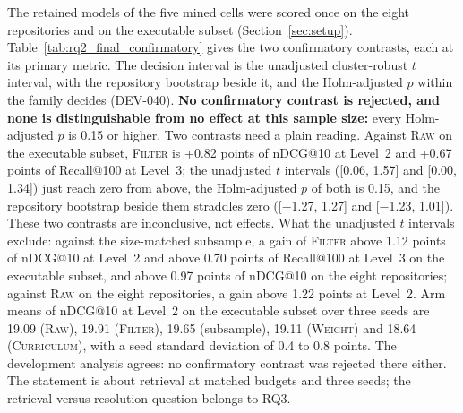 \documentclass[10pt,twocolumn]{article}
\begin{document}
The retained models of the five mined cells were scored once on the eight repositories and on the executable subset (Section~\ref{sec:setup}). Table~\ref{tab:rq2_final_confirmatory} gives the two confirmatory contrasts, each at its primary metric. The decision interval is the unadjusted cluster-robust $t$ interval, with the repository bootstrap beside it, and the Holm-adjusted $p$ within the family decides (DEV-040).
\textbf{No confirmatory contrast is rejected, and none is distinguishable from no effect at this sample size:} every Holm-adjusted $p$ is 0.15 or higher. %
Two contrasts need a plain reading. Against \textsc{Raw} on the executable subset, \textsc{Filter} is +0.82 points of nDCG@10 at Level~2 and +0.67 points of Recall@100 at Level~3; the unadjusted $t$ intervals ([0.06, 1.57] and [0.00, 1.34]) just reach zero from above, the Holm-adjusted $p$ of both is 0.15, and the repository bootstrap beside them straddles zero ([$-$1.27, 1.27] and [$-$1.23, 1.01]).
These two contrasts are inconclusive, not effects. %
What the unadjusted $t$ intervals exclude: against the size-matched subsample, a gain of \textsc{Filter} above 1.12 points of nDCG@10 at Level~2 and above 0.70 points of Recall@100 at Level~3 on the executable subset, and above 0.97 points of nDCG@10 on the eight repositories; against \textsc{Raw} on the eight repositories, a gain above 1.22 points at Level~2. %
Arm means of nDCG@10 at Level~2 on the executable subset over three seeds are 19.09 (\textsc{Raw}), 19.91 (\textsc{Filter}), 19.65 (subsample), 19.11 (\textsc{Weight}) and 18.64 (\textsc{Curriculum}), with a seed standard deviation of 0.4 to 0.8 points. %
The development analysis agrees: no confirmatory contrast was rejected there either. %
The statement is about retrieval at matched budgets and three seeds; the retrieval-versus-resolution question belongs to RQ3.


\end{document}
